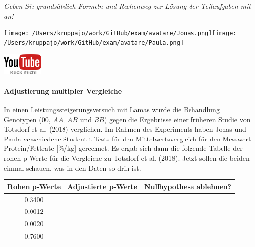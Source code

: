 \documentclass[a4paper, 9pt]{scrartcl}\usepackage[]{graphicx}\usepackage[]{xcolor}
\newenvironment{knitrout}{}{} %
\begin{document}
\textit{Geben Sie grundsätzlich Formeln und Rechenweg zur Lösung der Teilaufgaben mit an!} \\[1Ex]
 

 
\begin{minipage}[t]{0.5\textwidth}
\texttt{[image: /Users/kruppajo/work/GitHub/exam/avatare/Jonas.png]}\hspace{-4mm}\texttt{[image: /Users/kruppajo/work/GitHub/exam/avatare/Paula.png]}
\end{minipage}
\begin{minipage}[t]{0.5\textwidth}
\hfill
\href{https://youtu.be/kHmfEmU6lrk}{\includegraphics[width = 2cm]{img/youtube}}
\end{minipage}



\paragraph{Adjustierung multipler Vergleiche}

In einen Leistungssteigerungsversuch mit Lamas wurde die Behandlung Genotypen ($00$, $AA$, $AB$ und $BB$) gegen die Ergebnisse einer früheren Studie von Totsdorf et al. (2018) verglichen. Im Rahmen des Experiments haben Jonas und Paula verschiedene Student t-Tests für den Mittelwertsvergleich für den Messwert Protein/Fettrate [\%/kg] gerechnet. Es ergab sich dann die folgende Tabelle der rohen p-Werte für die Vergleiche zu Totsdorf et al. (2018). Jetzt sollen die beiden einmal schauen, was in den Daten so drin ist.

\begin{knitrout}
\color{fgcolor}\begin{table}[!h]
\centering\begingroup\fontsize{10}{12}\selectfont

\begin{tabular}{ccc}
\toprule
\textbf{Rohen p-Werte} & \textbf{Adjustierte p-Werte} & \textbf{Nullhypothese ablehnen?}\\
\midrule
0.3400 &  & \\
0.0012 &  & \\
0.0020 &  & \\
0.7600 &  & \\
\bottomrule
\end{tabular}
\endgroup{}
\end{table}

\end{knitrout}
\end{document}
